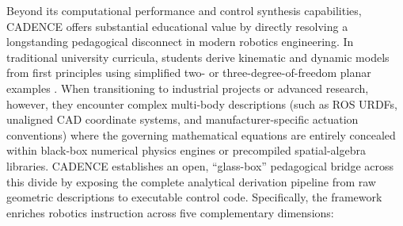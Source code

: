 \documentclass[fleqn,10pt]{article}
\begin{document}
Beyond its computational performance and control synthesis capabilities, CADENCE offers substantial educational value by directly resolving a longstanding pedagogical disconnect in modern robotics engineering. In traditional university curricula, students derive kinematic and dynamic models from first principles using simplified two- or three-degree-of-freedom planar examples \cite{craig2005introduction, spong2020robot, siciliano2010robotics}. When transitioning to industrial projects or advanced research, however, they encounter complex multi-body descriptions (such as ROS URDFs, unaligned CAD coordinate systems, and manufacturer-specific actuation conventions) where the governing mathematical equations are entirely concealed within black-box numerical physics engines or precompiled spatial-algebra libraries. CADENCE establishes an open, ``glass-box'' pedagogical bridge across this divide by exposing the complete analytical derivation pipeline from raw geometric descriptions to executable control code. Specifically, the framework enriches robotics instruction across five complementary dimensions:
\end{document}
